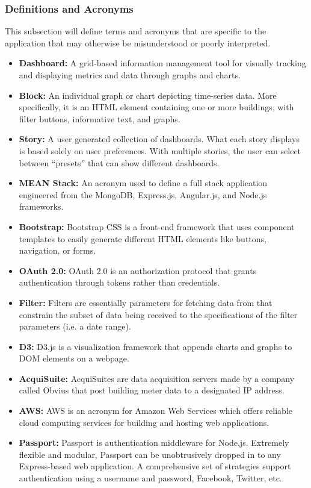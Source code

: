 \subsubsection{Definitions and Acronyms}
This subsection will define terms and acronyms that are specific to the application that may otherwise be misunderstood or poorly interpreted.
\begin{itemize}
    \item \textbf{Dashboard:}
        A grid-based information management tool for visually tracking and displaying metrics and data through graphs and charts.
    \item \textbf{Block:} 
        An individual graph or chart depicting time-series data. More specifically, it is an HTML element containing one or more buildings, with filter buttons, informative text, and graphs.
    \item \textbf{Story:} 
        A user generated collection of dashboards. What each story displays is based solely on user preferences. With multiple stories, the user can select between ``presets'' that can show different dashboards.
    \item \textbf{MEAN Stack:} 
        An acronym used to define a full stack application engineered from the MongoDB, Express.js, Angular.js, and Node.js frameworks. 
    \item \textbf{Bootstrap:} 
        Bootstrap CSS is a front-end framework that uses component templates to easily generate different HTML elements like buttons, navigation, or forms. 
    \item \textbf{OAuth 2.0:} 
        OAuth 2.0 is an authorization protocol that grants authentication through tokens rather than credentials. 
    \item \textbf{Filter:} 
        Filters are essentially parameters for fetching data from that constrain the subset of data being received to the specifications of the filter parameters (i.e. a date range). 
    \item \textbf{D3:} 
        D3.js is a visualization framework that appends charts and graphs to DOM elements on a webpage. 
    \item \textbf{AcquiSuite:} 
        AcquiSuites are data acquisition servers made by a company called Obvius that post building meter data to a designated IP address.
    \item \textbf{AWS:} 
        AWS is an acronym for Amazon Web Services which offers reliable cloud computing services for building and hosting web applications.
   \item \textbf{Passport:} 
        Passport is authentication middleware for Node.js. Extremely flexible and modular, Passport can be unobtrusively dropped in to any Express-based web application. A comprehensive set of strategies support authentication using a username and password, Facebook, Twitter, etc.
\end{itemize}
